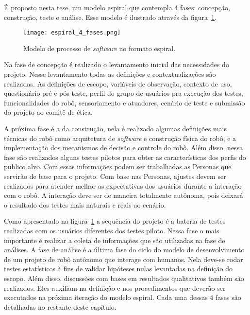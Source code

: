 É proposto nesta tese, um modelo espiral que contempla 4 fases: concepção, construção, teste e análise. Esse modelo é ilustrado através da figura~\ref{fig:espiral}.

\begin{figure}[ht!]
	\centering
	\begin{minipage}{0.7\textwidth}
		\caption{Modelo de processo de \textit{software} no formato espiral.}
		\texttt{[image: espiral\_4\_fases.png]}
		\label{fig:espiral}
	\end{minipage}
\end{figure}

Na fase de concepção é realizado o levantamento inicial das necessidades do projeto. Nesse levantamento todas as definições e contextualizações são realizadas. As definições de escopo, variáveis de observação, contexto de uso, questionário pré e pós teste, perfil do grupo de usuários pra execução dos testes, funcionalidades do robô, sensoriamento e atuadores, cenário de teste e submissão do projeto ao comitê de ética. 

A próxima fase é a da construção, nela é realizado algumas definições mais técnicas do robô como arquitetura de \textit{software} e construção física do robô, e a implementação dos mecanismos de decisão e controle do robô. Além disso, nessa fase são realizados alguns testes pilotos para obter as características dos perfis do publico alvo. Com essas informações podem ser trabalhadas as Personas que servirão de base para o projeto. Com base nas Personas, ajustes devem ser realizados para atender melhor as expectativas dos usuários durante a interação com o robô. A interação deve ser de maneira totalmente autônoma, pois deixará o resultado dos testes mais naturais e reais ao cenário.

Como apresentado na figura~\ref{fig:espiral} a sequência do projeto é a bateria de testes realizadas com os usuários diferentes dos testes piloto. Nessa fase o mais importante é realizar a coleta de informações que são utilizadas na fase de análises. A fase de análise é a última fase do ciclo do modelo de desenvolvimento de um projeto de robô autônomo que interage com humanos. Nela deve-se rodar testes estatísticos à fins de validar hipóteses nulas levantadas na definição do escopo. Além disso, discussões com bases em resultados qualitativos também são realizados. Eles auxiliam na definição e nos procedimentos que deverão ser executados na próxima iteração do modelo espiral. Cada uma dessas 4 fases são detalhadas no restante deste capítulo.

